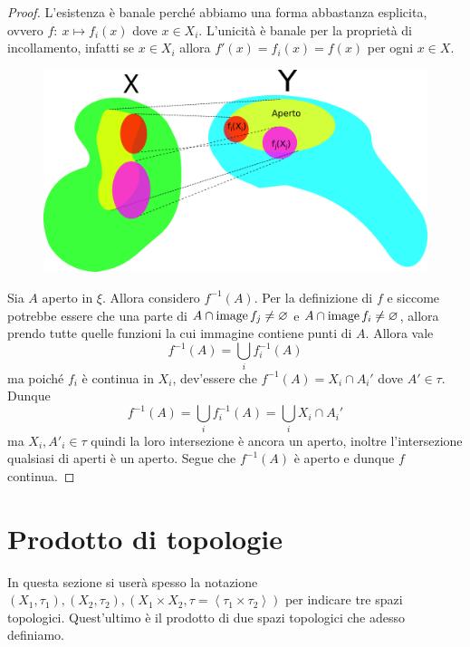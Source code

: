 \begin{proof}
	L'esistenza è banale perché abbiamo una forma abbastanza esplicita, ovvero $f \colon\ x \mapsto f_i(x)$ dove $x \in X_i$. L'unicità è banale per la proprietà di incollamento, infatti se $x \in X_i$ allora $f'(x) = f_i(x) = f(x)$ per ogni $x \in X$.
	
	\begin{figure}[h!]
		\centering
		\includegraphics[width=0.6\linewidth]{images/topologia_generale/Coomology_exercises_figure}
		\caption{}
		\label{fig:coomologyexercisesfigure}
	\end{figure}

	Sia $A$ aperto in $\xi$. Allora considero $f^{-1}(A)$. Per la definizione di $f$ e siccome potrebbe essere che una parte di $A \cap \operatorname{image}{f_j} \neq \varnothing$ e $A \cap \operatorname{image}{f_i} \neq \varnothing$, allora prendo tutte quelle funzioni la cui immagine contiene punti di $A$. Allora vale 
	\begin{equation*}
		f^{-1}(A) = \bigcup_{i} f_i^{-1}(A) 
	\end{equation*}
	ma poiché $f_i$ è continua in $X_i$, dev'essere che $f^{-1}(A) = X_i \cap A_i'$ dove $A' \in \tau$. Dunque 
	\begin{equation*}
		f^{-1}(A) = \bigcup_{i} f_i^{-1}(A) = \bigcup_{i} X_i \cap A_i' 
	\end{equation*}
	ma $X_i, A'_i \in \tau$ quindi la loro intersezione è ancora un aperto, inoltre l'intersezione qualsiasi di aperti è un aperto. Segue che $f^{-1}(A)$ è aperto e dunque $f$ continua.
\end{proof}


\section{Prodotto di topologie}

In questa sezione si userà spesso la notazione $(X_1, \tau_1), (X_2, \tau_2), (X_1 \times X_2, \tau = \left\langle\tau_1 \times \tau_2 \right\rangle)$ per indicare tre spazi topologici. Quest'ultimo è il prodotto di due spazi topologici che adesso definiamo.


